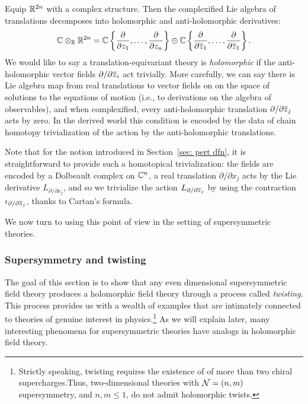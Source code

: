 \documentclass[11pt]{amsart}
\def\del{\partial}
\begin{document}
Equip $\mathbb R^{2n}$ with a complex structure.
Then the complexified Lie algebra of translations decomposes into holomorphic and anti-holomorphic derivatives:
\[
\mathbb C \otimes_{\mathbb R} \mathbb R^{2n} 
= \mathbb C\left\{\frac{\partial}{\partial z_1}, \ldots, \frac{\partial}{\partial z_n}\right\} 
\oplus \mathbb C\left\{\frac{\partial}{\partial {\overline{z}}_1}, \ldots, \frac{\partial}{\partial {\overline{z}}_1}\right\}.
\]
We would like to say a translation-equivariant theory is {\em holomorphic} if the anti-holomorphic vector fields $\del / \del {\zbar_i}$ act trivially.
More carefully, we can say there is Lie algebra map from real translations to vector fields on on the space of solutions to the equations of motion (i.e., to derivations on the algebra of observables),
and when complexified, every anti-holomorphic translation $\partial/\partial {\overline{z}}_j$ acts by zero.
In the derived world this condition is encoded by the data of chain homotopy trivialization of the action by the anti-holomorphic translations. 

Note that for the notion introduced in Section~\ref{sec: pert dfn},
it is straightforward to provide such a homotopical trivialization: 
the fields are encoded by a Dolbeault complex on $\mathbb C^n$, 
a real translation $\partial/\partial x_j$ acts by the Lie derivative $L_{\partial/\partial x_j}$,
and so we trivialize the action $L_{\partial/\partial {\overline{z}}_j}$ by using the contraction $\iota_{\partial/\partial {\overline{z}}_j}$,
thanks to Cartan's formula.

We now turn to using this point of view in the setting of supersymmetric theories.

\subsubsection{Supersymmetry and twisting}

The goal of this section is to show that any even dimensional supersymmetric field theory produces a holomorphic field theory through a process called {\em twisting}.
This process provides us with a wealth of examples that are intimately connected to theories of genuine interest in physics.\footnote{Strictly speaking, twisting requires the existence of of more than two chiral supercharges.Thus, two-dimensional theories with $\mathcal N = (n,m)$ supersymmetry, and $n,m \leq 1$, do not admit holomorphic twists.}
As we will explain later, many interesting phenomena for supersymmetric theories have analogs in holomorphic field theory.
 
\end{document}
